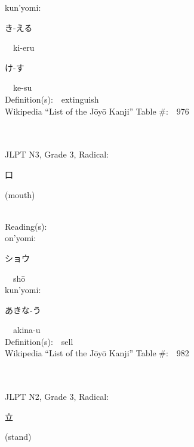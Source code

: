 \begin{multicols}{2}
{\hspace*{1em}}kun'yomi:\ \ \\
{\hspace*{2em}}{\begin{CJK}{UTF8}{min} き-える \end{CJK}}\ \ ki-eru\ \ \\
{\hspace*{2em}}{\begin{CJK}{UTF8}{min} け-す \end{CJK}}\ \ ke-su\ \ \\
Definition(s):\ \ extinguish \\
Wikipedia ``List of the J\=oy\=o Kanji'' Table \#:\ \ 976 \\
\ \ \\
{\fontsize{34pt}{40pt}  }\ \ \\  %
{JLPT N3, Grade 3, Radical:\ \ {\begin{CJK}{UTF8}{min} 口 \end{CJK}} (mouth) } \\
Reading(s):\ \ \\
{\hspace*{1em}}on'yomi:\ \ \\
{\hspace*{2em}}{\begin{CJK}{UTF8}{min} ショウ \end{CJK}}\ \ sh\=o\ \ \\
{\hspace*{1em}}kun'yomi:\ \ \\
{\hspace*{2em}}{\begin{CJK}{UTF8}{min} あきな-う \end{CJK}}\ \ akina-u\ \ \\
Definition(s):\ \ sell \\
Wikipedia ``List of the J\=oy\=o Kanji'' Table \#:\ \ 982 \\
\ \ \\
{\fontsize{34pt}{40pt}  }\ \ \\  %
{JLPT N2, Grade 3, Radical:\ \ {\begin{CJK}{UTF8}{min} 立 \end{CJK}} (stand) } \\

\end{multicols}
